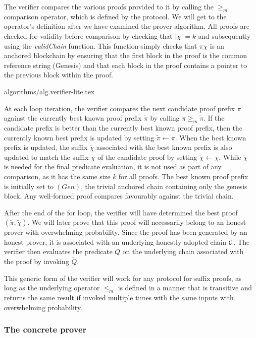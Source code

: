 The verifier compares the various proofs provided to it by calling the $\geq_m$
comparison operator, which is defined by the protocol. We will get to the
operator's definition after we have examined the prover algorithm. All proofs
are checked for validity before comparison by checking that $|\chi| = k$ and
subsequently using the \textit{validChain} function. This function simply checks
that $\pi\chi$ is an anchored blockchain by ensuring that the first block in the
proof is the common reference string (Genesis) and that each block in the proof
contains a pointer to the previous block within the proof.

{algorithms/alg.verifier-lite.tex}

At each loop iteration, the verifier compares the next candidate proof prefix
$\pi$ against the currently best known proof prefix $\tilde\pi$ by calling $\pi
\geq_m \tilde\pi$. If the candidate prefix is better than the currently best
known proof prefix, then the currently known best prefix is updated by setting
$\tilde\pi \leftarrow \pi$. When the best known prefix is updated, the suffix
$\tilde\chi$ associated with the best known prefix is also updated to match the
suffix $\chi$ of the candidate proof by setting $\tilde\chi \leftarrow \chi$.
While $\tilde\chi$ is needed for the final predicate evaluation, it is not used
as part of any comparison, as it has the same size $k$ for all proofs. The best
known proof prefix is initially set to $(Gen)$, the trivial anchored chain
containing only the genesis block. Any well-formed proof compares favourably
against the trivial chain.

After the end of the for loop, the verifier will have determined the best proof
$(\tilde\pi, \tilde\chi)$. We will later prove that this proof will necessarily
belong to an honest prover with overwhelming probability. Since the proof has
been generated by an honest prover, it is associated with an underlying honestly
adopted chain $\mathcal{C}$. The verifier then evaluates the predicate $Q$ on the
underlying chain associated with the proof by invoking $\tilde{Q}$.

This generic form of the verifier will work for any protocol for suffix proofs,
as long as the underlying operator $\leq_m$ is defined in a manner that is
transitive and returns the same result if invoked multiple times with the same
inputs with overwhelming probability.

\subsubsection{The concrete prover}

